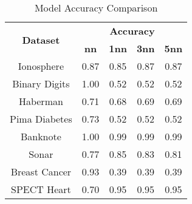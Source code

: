 \begin{table}[htbp]
\caption{Model Accuracy Comparison}
\begin{center}
\begin{tabular}{|c|c|c|c|c|}
\hline
\multirow{2}{*}{\textbf{Dataset}} & \multicolumn{4}{c|}{\textbf{Accuracy}} \\ \cline{2-5}
 & \textbf{nn} & \textbf{1nn} & \textbf{3nn} & \textbf{5nn} \\ \hline
Ionosphere & 0.87 & 0.85 & 0.87 & 0.87 \\ \hline
Binary Digits & 1.00 & 0.52 & 0.52 & 0.52 \\ \hline
Haberman & 0.71 & 0.68 & 0.69 & 0.69 \\ \hline
Pima Diabetes & 0.73 & 0.52 & 0.52 & 0.52 \\ \hline
Banknote & 1.00 & 0.99 & 0.99 & 0.99 \\ \hline
Sonar & 0.77 & 0.85 & 0.83 & 0.81 \\ \hline
Breast Cancer & 0.93 & 0.39 & 0.39 & 0.39 \\ \hline
SPECT Heart & 0.70 & 0.95 & 0.95 & 0.95 \\ \hline
\end{tabular}
\label{tab:accuracy}
\end{center}
\end{table}
